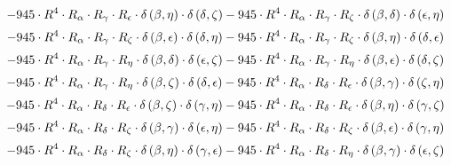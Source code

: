 \begin{subequations}
\begin{gather}
 \\[0.2em] \notag 		 - 945 \cdot R^{4} \cdot R_{\alpha{}} \cdot R_{\gamma{}} \cdot R_{\epsilon{}} \cdot \delta{}\left(\beta{}, \eta{}\right) \cdot \delta{}\left(\delta{}, \zeta{}\right)- 945 \cdot R^{4} \cdot R_{\alpha{}} \cdot R_{\gamma{}} \cdot R_{\zeta{}} \cdot \delta{}\left(\beta{}, \delta{}\right) \cdot \delta{}\left(\epsilon{}, \eta{}\right) 
 \\[0.2em] \notag 		 - 945 \cdot R^{4} \cdot R_{\alpha{}} \cdot R_{\gamma{}} \cdot R_{\zeta{}} \cdot \delta{}\left(\beta{}, \epsilon{}\right) \cdot \delta{}\left(\delta{}, \eta{}\right)- 945 \cdot R^{4} \cdot R_{\alpha{}} \cdot R_{\gamma{}} \cdot R_{\zeta{}} \cdot \delta{}\left(\beta{}, \eta{}\right) \cdot \delta{}\left(\delta{}, \epsilon{}\right) 
 \\[0.2em] \notag 		 - 945 \cdot R^{4} \cdot R_{\alpha{}} \cdot R_{\gamma{}} \cdot R_{\eta{}} \cdot \delta{}\left(\beta{}, \delta{}\right) \cdot \delta{}\left(\epsilon{}, \zeta{}\right)- 945 \cdot R^{4} \cdot R_{\alpha{}} \cdot R_{\gamma{}} \cdot R_{\eta{}} \cdot \delta{}\left(\beta{}, \epsilon{}\right) \cdot \delta{}\left(\delta{}, \zeta{}\right) 
 \\[0.2em] \notag 		 - 945 \cdot R^{4} \cdot R_{\alpha{}} \cdot R_{\gamma{}} \cdot R_{\eta{}} \cdot \delta{}\left(\beta{}, \zeta{}\right) \cdot \delta{}\left(\delta{}, \epsilon{}\right)- 945 \cdot R^{4} \cdot R_{\alpha{}} \cdot R_{\delta{}} \cdot R_{\epsilon{}} \cdot \delta{}\left(\beta{}, \gamma{}\right) \cdot \delta{}\left(\zeta{}, \eta{}\right) 
 \\[0.2em] \notag 		 - 945 \cdot R^{4} \cdot R_{\alpha{}} \cdot R_{\delta{}} \cdot R_{\epsilon{}} \cdot \delta{}\left(\beta{}, \zeta{}\right) \cdot \delta{}\left(\gamma{}, \eta{}\right)- 945 \cdot R^{4} \cdot R_{\alpha{}} \cdot R_{\delta{}} \cdot R_{\epsilon{}} \cdot \delta{}\left(\beta{}, \eta{}\right) \cdot \delta{}\left(\gamma{}, \zeta{}\right) 
 \\[0.2em] \notag 		 - 945 \cdot R^{4} \cdot R_{\alpha{}} \cdot R_{\delta{}} \cdot R_{\zeta{}} \cdot \delta{}\left(\beta{}, \gamma{}\right) \cdot \delta{}\left(\epsilon{}, \eta{}\right)- 945 \cdot R^{4} \cdot R_{\alpha{}} \cdot R_{\delta{}} \cdot R_{\zeta{}} \cdot \delta{}\left(\beta{}, \epsilon{}\right) \cdot \delta{}\left(\gamma{}, \eta{}\right) 
 \\[0.2em] \notag 		 - 945 \cdot R^{4} \cdot R_{\alpha{}} \cdot R_{\delta{}} \cdot R_{\zeta{}} \cdot \delta{}\left(\beta{}, \eta{}\right) \cdot \delta{}\left(\gamma{}, \epsilon{}\right)- 945 \cdot R^{4} \cdot R_{\alpha{}} \cdot R_{\delta{}} \cdot R_{\eta{}} \cdot \delta{}\left(\beta{}, \gamma{}\right) \cdot \delta{}\left(\epsilon{}, \zeta{}\right) 

\end{gather}
\end{subequations}

